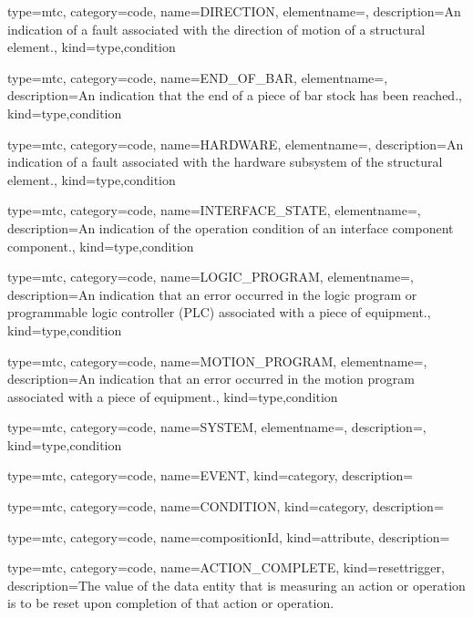 {
  type=mtc,
  category=code,
  name={DIRECTION},
  elementname=,
  description={An indication of a fault associated with the direction of motion of a \gls{structural element}.},
  kind={type,condition}
}


{
  type=mtc,
  category=code,
  name={END\_OF\_BAR},
  elementname=,
  description={An indication that the end of a piece of bar stock has been reached.},
  kind={type,condition}
}


{
  type=mtc,
  category=code,
  name={HARDWARE},
  elementname=,
  description={An indication of a fault associated with the hardware subsystem of the \gls{structural element}.},
  kind={type,condition}
}


{
  type=mtc,
  category=code,
  name={INTERFACE\_STATE},
  elementname=,
  description={An indication of the operation condition of an \gls{interface component} component.},
  kind={type,condition}
}


{
  type=mtc,
  category=code,
  name={LOGIC\_PROGRAM},
  elementname=,
  description={An indication that an error occurred in the logic program or programmable logic controller (PLC) associated with a piece of equipment.},
  kind={type,condition}
}


{
  type=mtc,
  category=code,
  name={MOTION\_PROGRAM},
  elementname=,
  description={An indication that an error occurred in the motion program associated with a piece of equipment.},
  kind={type,condition}
}


{
  type=mtc,
  category=code,
  name={SYSTEM},
  elementname=,
  description={},
  kind={type,condition}
}


{
  type=mtc,
  category=code,
  name={EVENT},
  kind={category},
  description={}
}


{
  type=mtc,
  category=code,
  name={CONDITION},
  kind={category},
  description={}
}


{
  type=mtc,
  category=code,
  name={compositionId},
  kind={attribute},
  description={}
}


{
  type=mtc,
  category=code,
  name={ACTION\_COMPLETE},
  kind={resettrigger},
  description={The value of the \gls{data entity} that is measuring an action or operation is to be reset upon completion of that action or operation.}
}


